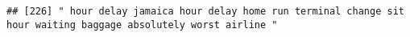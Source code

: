 \documentclass[
]{article}
\begin{document}
\begin{verbatim}
## [226] " hour delay jamaica hour delay home run terminal change sit hour waiting baggage absolutely worst airline "                                                                                                                                                                                                                                                                                                                                                                                                                                                                                                                                                                                                                                                                                                                                                                                                                                                                                                                                                                                                                                                                                                                                                                                                                                                                                                                                                                                                                                                                                                                                                                                                                                                                                    

\end{verbatim}
\end{document}
